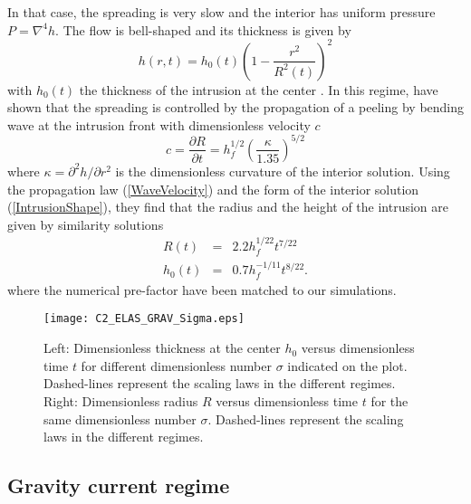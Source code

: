 In that case, the spreading is  very slow and the interior has uniform
pressure $P =\nabla^4h$.  The flow is bell-shaped and its thickness is
given by
\begin{equation}
  h(r,t) = h_0(t)\left(1-\frac{r^2}{R^2(t)}\right)^2
  \label{IntrusionShape}
\end{equation}
with  $h_0(t)$   the  thickness  of   the  intrusion  at   the  center
\citep{Michaut:2011kg,Lister:2013ia}.       In       this      regime,
\citet{Lister:2013ia} have  shown that the spreading  is controlled by
the propagation  of a peeling by  bending wave at the  intrusion front
with dimensionless velocity $c$
\begin{equation}
  c=    \frac{\partial             R}{\partial            t}             =h_f^{1/2}
  \left(\frac{\kappa}{1.35}\right)^{5/2}
  \label{WaveVelocity}
\end{equation}
where  $\kappa  =  \partial^2  h/\partial r^2$  is  the  dimensionless
curvature  of  the  interior  solution.   Using  the  propagation  law
(\ref{WaveVelocity})   and  the   form   of   the  interior   solution
(\ref{IntrusionShape}), they  find that the  radius and the  height of
the intrusion are given by similarity solutions
\begin{eqnarray}
  R(t) &=& 2.2h_f^{1/22}t^{7/22}\label{ScalingR}\\
  h_0(t)&=&0.7 h_f^{-1/11}t^{8/22}\label{ScalingH}.
\end{eqnarray}
where the numerical pre-factor have been matched to our simulations.

\begin{figure}
  \begin{center}
    \graphicspath{ {/Users/thorey/Documents/These/Manuscript/Figure/Chapter2/} }
    \texttt{[image: C2\_ELAS\_GRAV\_Sigma.eps]}
    \caption{Left: Dimensionless thickness at  the center $h_0$ versus
      dimensionless  time  $t$   for  different  dimensionless  number
      $\sigma$  indicated on  the  plot.   Dashed-lines represent  the
      scaling  laws in  the different  regimes.  Right:  Dimensionless
      radius  $R$   versus  dimensionless   time  $t$  for   the  same
      dimensionless  number  $\sigma$.    Dashed-lines  represent  the
      scaling laws in the different regimes.}
    \label{C2_ELAS_GRAV_Sigma}
  \end{center}
\end{figure}

\subsection{Gravity current regime}
\label{C2-sec:grav-curr-regime}

